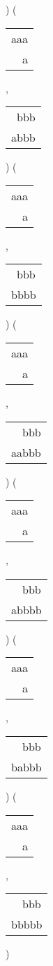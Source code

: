 ) 
 ( 
\begin{tabular}{|l|} \hline
aaa \\
\ \ a \\
\hline
\end{tabular} 
 , 
\begin{tabular}{|l|} \hline
\ bbb \\
abbb \\
\hline
\end{tabular} 
) 
 ( 
\begin{tabular}{|l|} \hline
aaa \\
\ \ a \\
\hline
\end{tabular} 
 , 
\begin{tabular}{|l|} \hline
\ bbb \\
bbbb \\
\hline
\end{tabular} 
) 
 ( 
\begin{tabular}{|l|} \hline
aaa \\
\ \ a \\
\hline
\end{tabular} 
 , 
\begin{tabular}{|l|} \hline
\ \ bbb \\
aabbb \\
\hline
\end{tabular} 
) 
 ( 
\begin{tabular}{|l|} \hline
aaa \\
\ \ a \\
\hline
\end{tabular} 
 , 
\begin{tabular}{|l|} \hline
\ \ bbb \\
abbbb \\
\hline
\end{tabular} 
) 
 ( 
\begin{tabular}{|l|} \hline
aaa \\
\ \ a \\
\hline
\end{tabular} 
 , 
\begin{tabular}{|l|} \hline
\ \ bbb \\
babbb \\
\hline
\end{tabular} 
) 
 ( 
\begin{tabular}{|l|} \hline
aaa \\
\ \ a \\
\hline
\end{tabular} 
 , 
\begin{tabular}{|l|} \hline
\ \ bbb \\
bbbbb \\
\hline
\end{tabular} 
) 
